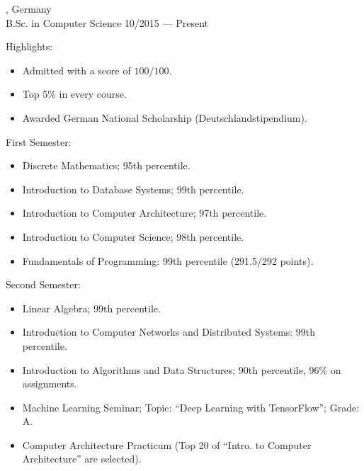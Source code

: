 \begin{entry}
	{, Germany}
	{\\B.Sc. in Computer Science}
	{10/2015 --- Present}
  \item Highlights:
  \begin{itemize}
    \item Admitted with a score of $100/100$.
    \item Top 5\% in every course.
    \item Awarded German National Scholarship (Deutschlandstipendium).
  \end{itemize}
  \item First Semester:
  \begin{itemize}
    \item Discrete Mathematics; 95th percentile.
    \item Introduction to Database Systems; 99th percentile.
    \item Introduction to Computer Architecture; 97th percentile.
    \item Introduction to Computer Science; 98th percentile.
    \item Fundamentals of Programming: 99th percentile (291.5/292 points).
  \end{itemize}
  \item Second Semester:
  \begin{itemize}
    \item Linear Algebra; 99th percentile.
    \item Introduction to Computer Networks and Distributed Systems: 99th percentile.
    \item Introduction to Algorithms and Data Structures; 90th percentile, 96\% on assignments.
    \item Machine Learning Seminar; Topic: ``Deep Learning with TensorFlow''; Grade: A.
    \item Computer Architecture Practicum (Top 20 of ``Intro. to Computer Architecture'' are selected).
  \end{itemize}
\end{entry}

